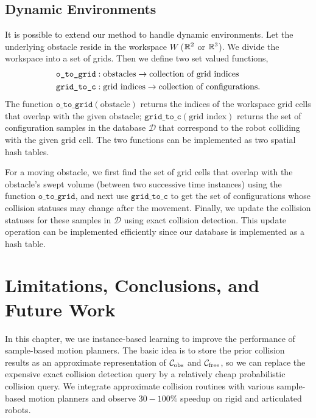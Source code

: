 \subsection{Dynamic Environments}
It is possible to extend our method to handle dynamic environments. Let the underlying obstacle reside in the workspace $W$ ($\mathbb R^2$ or $\mathbb R^3$). We divide the workspace into a set of grids. Then we define two set valued functions,
\begin{align}
\texttt{o\_to\_grid}&: \text{obstacles} \rightarrow \text{collection of grid indices} \notag \\
\texttt{grid\_to\_c}&: \text{grid indices} \rightarrow \text{collection of configurations}. \notag
\end{align}
The function $\texttt{o\_to\_grid}(\text{obstacle})$ returns the indices of the workspace grid cells that overlap with the given obstacle; $\texttt{grid\_to\_c}(\text{grid index})$ returns the set of configuration samples in the database $\mathcal D$ that correspond to the robot colliding with the given grid cell. The two functions can be implemented as two spatial hash tables.

For a moving obstacle, we first find the set of grid cells that overlap with the obstacle's swept volume (between two successive time instances) using the function $\texttt{o\_to\_grid}$, and next use $\texttt{grid\_to\_c}$ to get the set of configurations whose collision statuses may change after the movement. Finally, we update the collision statuses for these samples in $\mathcal D$ using exact collision detection. This update operation can be implemented efficiently since our database is implemented as a hash table.


\section{Limitations, Conclusions, and Future Work}

In this chapter, we use instance-based learning to improve the performance of sample-based motion planners. The basic idea is to store the prior collision results as an approximate representation of $\mathcal C_{\text{obs}}$ and $\mathcal C_{\text{free}}$, so we can replace the expensive exact collision detection query by a relatively cheap probabilistic collision query. We integrate approximate collision routines with various sample-based motion planners and observe $30-100\%$ speedup on rigid and articulated robots.

